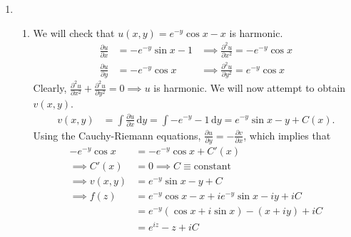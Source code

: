 \documentclass{article}
\newcommand{\party}[2] {\frac{\partial #1}{\partial #2}}
\newcommand{\partyy}[2] {\frac{\partial^2 #1}{\partial {#2}^2}}
\begin{document}
\begin{enumerate}
\begin{enumerate}
\end{enumerate}
\item
\begin{enumerate}
\item

We will check that $u(x,y) = e^{-y} \cos x - x $ is harmonic.
\begin{align*}
\party{u}{x} &= -e^{-y} \sin x - 1 &\implies \partyy{u}{x} = -e^{-y} \cos x \\
\party{u}{y} &= -e^{-y} \cos x  &\implies \partyy{u}{y} = e^{-y} \cos x 
\end{align*}
Clearly, $\partyy{u}{x} + \partyy{u}{y} = 0 \implies u$ is harmonic.
We will now attempt to obtain $v(x,y)$.
\begin{align*}
v(x,y) &=  \int \party{u}{x} \,\text{d}y = \int -e^{-y} - 1 \,\text{d}y = e^{-y} \sin x - y + C(x).
\end{align*}
Using the Cauchy-Riemann equations, $\party{u}{y} = -\party{v}{x}$, which implies that
\begin{align*}
-e^{-y} \cos x &= -e^{-y} \cos x + C'(x) \\ \implies C'(x) &= 0  \implies C \equiv \text{constant} \\
\implies v(x,y) &= e^{-y} \sin x - y + C \\
\implies f(z) &= e^{-y} \cos x - x + ie^{-y} \sin x - iy + iC \\
&= e^{-y}(\cos x + i\sin x) - (x + iy) + iC \\
&= e^{iz} -z + iC
 \end{align*}


\end{enumerate}
\end{enumerate}
\end{document}
